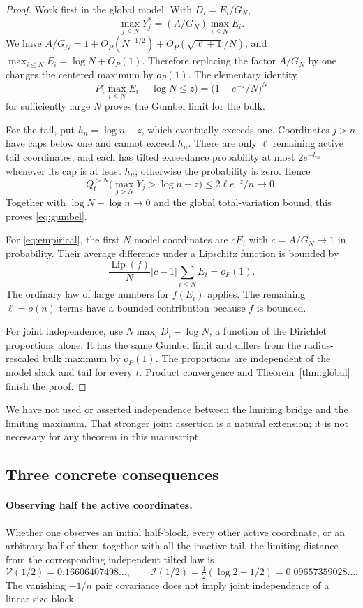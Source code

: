 \documentclass[11pt,letterpaper]{article}
\numberwithin{equation}{section}
\theoremstyle{definition}
\theoremstyle{remark}
\newcommand{\vp}{\mathcal V}
\newcommand{\ip}{\mathcal I}
\begin{document}
\begin{proof}
Work first in the global model. With $D_i=E_i/G_N$,
\[
 \max_{j\le N}Y_j^*=(A/G_N)\max_{i\le N}E_i.
\]
We have $A/G_N=1+O_P(N^{-1/2})+O_P(\sqrt{\ell+1}/N)$, and
$\max_{i\le N}E_i=\log N+O_P(1)$. Therefore replacing the factor $A/G_N$
by one changes the centered maximum by $o_P(1)$. The elementary identity
\[
 P\big(\max_{i\le N}E_i-\log N\le z\big)
 =\big(1-e^{-z}/N\big)^N
\]
for sufficiently large $N$ proves the Gumbel limit for the bulk.

For the tail, put $h_n=\log n+z$, which eventually exceeds one. Coordinates
$j>n$ have caps below one and cannot exceed $h_n$. There are only $\ell$
remaining active tail coordinates, and each has tilted exceedance probability
at most $2e^{-h_n}$ whenever its cap is at least $h_n$; otherwise the probability
is zero. Hence
\[
 Q_t^{>N}\big(\max_{j>N}Y_j>\log n+z\big)
 \le2\ell e^{-z}/n\longrightarrow0.
\]
Together with $\log N-\log n\to0$ and the global total-variation bound, this
proves \eqref{eq:gumbel}.

For \eqref{eq:empirical}, the first $N$ model coordinates are $cE_i$ with
$c=A/G_N\to1$ in probability. Their average difference under a Lipschitz
function is bounded by
\[
 \frac{\operatorname{Lip}(f)}{N}|c-1|\sum_{i\le N}E_i=o_P(1).
\]
The ordinary law of large numbers for $f(E_i)$ applies. The remaining
$\ell=o(n)$ terms have a bounded contribution because $f$ is bounded.

For joint independence, use $N\max_i D_i-\log N$, a function of the
Dirichlet proportions alone. It has the same Gumbel limit and differs from
the radius-rescaled bulk maximum by $o_P(1)$. The proportions are independent
of the model slack and tail for every $t$. Product convergence and
Theorem~\ref{thm:global} finish the proof.
\end{proof}

We have not used or asserted independence between the limiting bridge and
the limiting maximum. That stronger joint assertion is a natural extension;
it is not necessary for any theorem in this manuscript.

\subsection{Three concrete consequences}

\paragraph{Observing half the active coordinates.}
Whether one observes an initial half-block, every other active coordinate,
or an arbitrary half of them together with all the inactive tail, the limiting
distance from the corresponding independent tilted law is
\[
 \vp(1/2)=0.16606407498\ldots,
 \qquad
 \ip(1/2)=\tfrac12(\log2-1/2)=0.09657359028\ldots.
\]
The vanishing $-1/n$ pair covariance does not imply joint independence of a
linear-size block.
\end{document}
